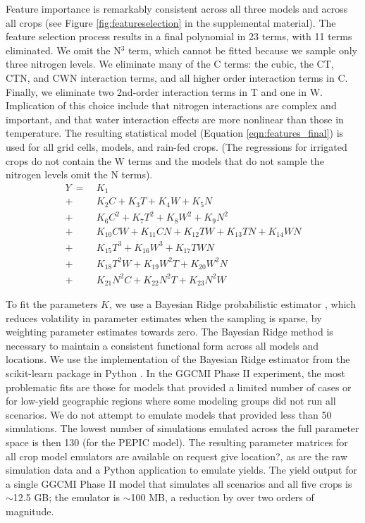 \documentclass[preprint, 5p, times, twocolumn]{elsarticle}
\begin{document}
Feature importance is remarkably consistent across all three models and across all crops (see Figure \ref{fig:featureselection} in the supplemental material). The feature selection process results in a final polynomial in 23 terms, with 11 terms eliminated. We omit the N$^3$ term, which cannot be fitted because we sample only three nitrogen levels. We eliminate many of the C terms: the cubic, the CT, CTN, and CWN interaction terms, and all higher order interaction terms in C. Finally, we eliminate two 2nd-order interaction terms in T and one in W. Implication of this choice include that nitrogen interactions are complex and important, and that water interaction effects are more nonlinear than those in temperature. The resulting statistical model (Equation \ref{eqn:features_final}) is used for all grid cells, models, and rain-fed crops. (The regressions for irrigated crops do not contain the W terms and the models that do not sample the nitrogen levels omit the N terms).
\begin{align}
    \label{eqn:features_final}
    Y\ = \ & K_{1}  \\
       + \ & K_{2}  C     + K_{3}  T     + K_{4}  W     + K_{5}  N   \nonumber \\
       + \ & K_{6}  C^2   + K_{7}  T^2   + K_{8}  W^2   + K_{9}  N^2 \nonumber \\
       + \ & K_{10} C W   + K_{11} C N   + K_{12} T W   + K_{13} T N + K_{14} W N \nonumber \\ %
       + \ & K_{15} T^3   + K_{16} W^3   + K_{17} T W N  \nonumber \\ %
       + \ & K_{18} T^2 W + K_{19} W^2 T + K_{20} W^2 N  \nonumber \\ %
       + \ & K_{21} N^2 C + K_{22} N^2 T + K_{23} N^2 W  \nonumber    %
\end{align}

To fit the parameters $K$, we use a Bayesian Ridge probabilistic estimator \citep{MacKay91}, which reduces volatility in parameter estimates when the sampling is sparse, by weighting parameter estimates towards zero. The Bayesian Ridge method is necessary to maintain a consistent functional form across all models and locations. We use the implementation of the Bayesian Ridge estimator from the scikit-learn package in Python \citep{scikit-learn}. In the GGCMI Phase II experiment, the most problematic fits are those for models that provided a limited number of cases or for low-yield geographic regions where some modeling groups did not run all scenarios. We do not attempt to emulate models that provided less than 50 simulations. The lowest number of simulations emulated across the full parameter space is then 130 (for the PEPIC model). The resulting parameter matrices for all crop model emulators are available on request {\color{red} give location?}, as are the raw simulation data and a Python application to emulate yields. The yield output for a single GGCMI Phase II model that simulates all scenarios and all five crops is $\sim$12.5 GB; the emulator is $\sim$100 MB, a reduction by over two orders of magnitude. 
\end{document}
